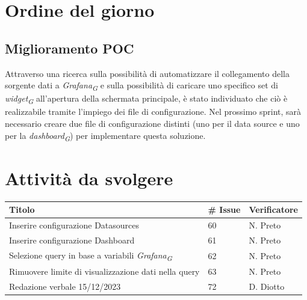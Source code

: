 \documentclass{article}
\begin{document}
\section{Ordine del giorno}
    \subsection{Miglioramento POC}
    Attraverso una ricerca sulla possibilità di automatizzare il collegamento della sorgente dati a \textit{Grafana}\textsubscript{\textit{G}} e sulla possibilità di caricare uno specifico set di \textit{widget}\textsubscript{\textit{G}} all'apertura della schermata principale, è stato individuato che ciò è realizzabile tramite l'impiego dei file di configurazione. Nel prossimo sprint, sarà necessario creare due file di configurazione distinti (uno per il data source e uno per la \textit{dashboard}\textsubscript{\textit{G}}) per implementare questa soluzione.

\section{Attività da svolgere}
    \begin{center}
        \begin{tabular}{|C{7cm}|C{1,5cm}|C{3cm}|}
            \hline
            \textbf{Titolo} & \textbf{\# Issue} & \textbf{Verificatore} \\
            \hline\hline
            Inserire configurazione Datasources & 60 & N. Preto \\
            Inserire configurazione Dashboard & 61 & N. Preto \\
            Selezione query in base a variabili \textit{Grafana}\textsubscript{\textit{G}} & 62 & N. Preto \\
            Rimuovere limite di visualizzazione dati nella query & 63 & N. Preto \\
            Redazione verbale 15/12/2023 & 72 & D. Diotto \\
            \hline
        \end{tabular}
    \end{center}
\end{document}
